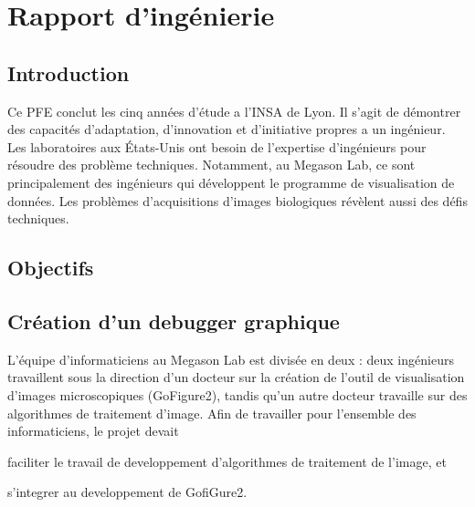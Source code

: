 

\chapter{Rapport d'ingénierie} 











\section{Introduction}

Ce PFE conclut les cinq années d'étude a l'INSA de Lyon. Il s'agit de démontrer des capacités d'adaptation, d'innovation et d'initiative propres a un ingénieur. Les laboratoires aux États-Unis ont besoin de l'expertise d'ingénieurs pour résoudre des problème techniques. Notamment, au Megason Lab, ce sont principalement des ingénieurs qui développent le programme de visualisation de données. Les problèmes d'acquisitions d'images biologiques révèlent aussi des défis techniques.
 
\section{Objectifs}





\section{Création d'un debugger graphique}

L'équipe d'informaticiens au Megason Lab est divisée en deux : deux ingénieurs travaillent sous la direction d'un docteur sur la création de l'outil de visualisation d'images microscopiques (GoFigure2), tandis qu'un autre docteur travaille sur des algorithmes de traitement d'image. Afin de travailler pour l'ensemble des informaticiens, le projet devait
\begin{inparaenum}[(i)]
  \item faciliter le travail de developpement d'algorithmes de traitement de l'image, et 
  \item s'integrer au developpement de GofiGure2.
\end{inparaenum}


